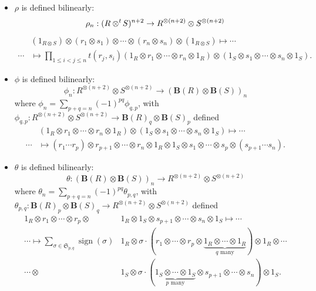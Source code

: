 \documentclass{article}
\newcommand{\ten}{\otimes}
\newcommand{\twisten}{\otimes^t\hspace{-1pt}}
\newcommand{\bezt}{\underline{\operatorname{EZ}}^t}
\newcommand{\bawt}{\underline{\operatorname{AW}}^t}
\newcommand{\sign}{\operatorname{sign}}
\theoremstyle{plain}
\theoremstyle{definition}
\begin{document}
\begin{center}
\end{center}
\begin{itemize}
\item $\rho$ is defined bilinearly:
$$\rho_n: (R \twisten S)^{n+2} \rightarrow R^{\otimes (n+2)} \otimes S^{\otimes (n+2)}$$ 
$$\begin{aligned}
&(1_{R \otimes S}) \otimes (r_1 \otimes s_1) \otimes \cdots \otimes (r_n \otimes s_n) \otimes (1_{R \otimes S})\mapsto \cdots \\
\cdots &\mapsto \prod_{1\leq i<j\leq n} t(r_j,s_i)(1_R \ten r_1 \ten \cdots \ten r_n \ten 1_R) \otimes (1_S \ten s_1 \ten \cdots \ten s_n \ten 1_S) .\end{aligned}$$
\item  $\phi$ is defined bilinearly:
$$ \phi_n: R^{\otimes (n+2)} \otimes S^{\otimes (n+2)} \rightarrow (\mathbf{B}(R) \otimes \mathbf{B}(S))_n$$
where $\phi_n = \sum_{p+q=n} (-1)^{pq} \phi_{q,p}$, with $\phi_{q,p}: R^{\otimes (n+2)} \otimes S^{\otimes (n+2)} \rightarrow \mathbf{B}(R)_q \otimes \mathbf{B}(S)_p$ defined
$$\begin{aligned} & (1_R \ten r_1 \ten \cdots \ten r_n \ten 1_R) \otimes (1_S \ten s_1 \ten \cdots \ten s_n \ten 1_S) \mapsto \cdots \\
 \cdots &\mapsto (r_1 \cdots r_p) \otimes r_{p+1} \otimes \cdots \otimes r_n \otimes 1_R \otimes 1_S \otimes s_1 \otimes \cdots \otimes s_p \otimes (s_{p+1} \cdots s_n).
\end{aligned}$$

 \item $\theta$ is defined bilinearly:
 $$ \theta: (\mathbf{B}(R) \otimes \mathbf{B}(S))_n \rightarrow R^{\otimes (n+2)} \otimes S^{\otimes (n+2)} $$
where $\theta_n = \sum_{p+q=n} (-1)^{pq} \theta_{p,q}$, with $\theta_{p,q}:\mathbf{B}(R)_p \otimes \mathbf{B}(S)_q \rightarrow  R^{\otimes (n+2)} \otimes S^{\otimes (n+2)}$ defined
$$ \begin{aligned}  1_R \otimes r_1 \otimes \cdots \otimes r_p \otimes &1_R \otimes 1_S \otimes s_{p+1} \otimes \cdots \otimes s_n \otimes 1_S \mapsto \cdots \\
\cdots  \mapsto \sum_{\sigma \in \mathfrak{S}_{p,q}} \sign(\sigma) &1_R \otimes \sigma\cdot(r_1 \otimes \cdots \otimes r_p \otimes \underbrace{1_R \otimes \cdots \otimes 1_R}_{q\textrm{ many}}) \otimes 1_R \otimes \cdots \\ \cdots\otimes &1_S \otimes \sigma \cdot( \underbrace{1_S \otimes \cdots \otimes 1_S}_{p\textrm{ many}}\otimes s_{p+1} \otimes \cdots \otimes s_n) \otimes 1_S .\end{aligned}$$
\end{itemize}
\end{document}
